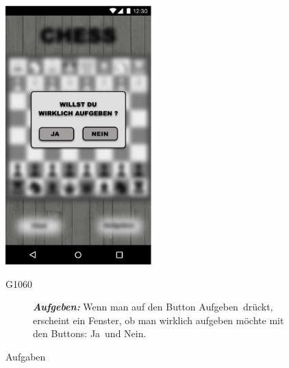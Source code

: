 \documentclass[parskip=full]{scrartcl}
\begin{document}
\begin{figure}[htp]
	\begin{minipage}[t]{6cm}
		\vspace{0pt}
		\includegraphics[height=100mm]{aufgeben.png}
		\caption{Aufgaben}
		\label{fig:Aufgeben}
	\end{minipage}
	\hfill
	\begin{minipage}[t]{6cm}
		\vspace{0pt}
		\begin{description}
			\item[G1060] \textbf{\textit{Aufgeben: }} Wenn man auf den Button \glqq Aufgeben\grqq\  drückt, erscheint ein Fenster, ob man wirklich aufgeben möchte mit den Buttons: \glqq Ja\grqq\ und \glqq Nein\grqq.
		\end{description}
	\end{minipage}
\end{figure}
\end{document}
